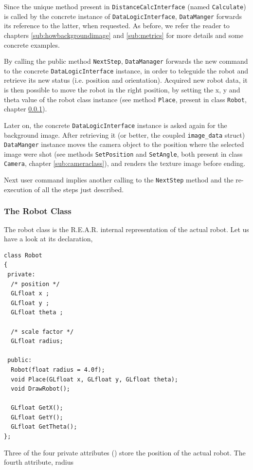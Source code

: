%
Since the unique method present in \texttt{DistanceCalcInterface} (named \texttt{Calculate}) is called by the
concrete instance of \texttt{DataLogicInterface}, \newline \texttt{DataManger} forwards its reference to the latter,
when requested. As before, we refer the reader to chapters \ref{sub:howbackgroundimage} and \ref{sub:metrics} for
more details and some concrete examples.
%

%
By calling the public method \texttt{NextStep}, \texttt{DataManager} forwards the new command to the concrete
\texttt{DataLogicInterface} instance, in order to teleguide the robot and retrieve its new status
(i.e. position and orientation). Acquired new robot data, it is then possible to move the robot in the
right position, by setting the x, y and theta value of the robot class instance (see method \texttt{Place},
present in class \texttt{Robot}, chapter \ref{sub:robotclass}).
%

%
Later on, the concrete \texttt{DataLogicInterface} instance is asked again for the background image. After
retrieving it (or better, the coupled \texttt{image\_data} struct) \texttt{DataManger} instance moves the camera
object to the position where the selected image were shot (see methods \texttt{SetPosition} and \texttt{SetAngle},
both present in class \texttt{Camera}, chapter \ref{sub:cameraclass}), and renders the texture image before ending.
%

%
Next user command implies another calling to the \texttt{NextStep} method and the re-execution of all the steps just
described.




\subsubsection{The Robot Class}
\label{sub:robotclass}

The robot class is the \textsf{R.E.A.R.} internal representation of 
the actual robot. Let us have a look at its declaration,

\begin{lstlisting}[caption={Robot class declaration}, label={code:robot_class}, frame=trBL]
class Robot
{
 private:
  /* position */
  GLfloat x ;
  GLfloat y ;					
  GLfloat theta ;  
  
  /* scale factor */
  GLfloat radius; 

 public:
  Robot(float radius = 4.0f);
  void Place(GLfloat x, GLfloat y, GLfloat theta);
  void DrawRobot();

  GLfloat GetX();
  GLfloat GetY();
  GLfloat GetTheta();    
};
\end{lstlisting}
%
Three of the four private attributes () 
store the position of the actual robot. The fourth attribute, 
\textsf{radius}


